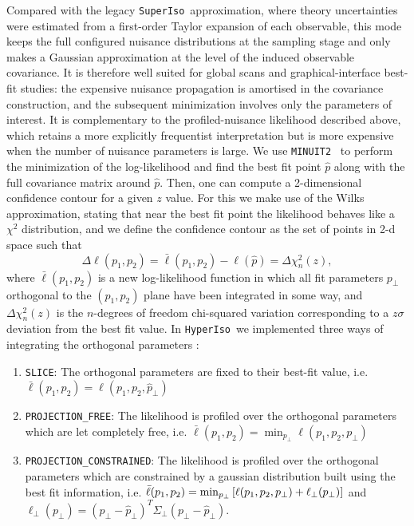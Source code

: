 \documentclass[preprint,11pt]{elsarticle}
\newcommand{\hi}{\texttt{HyperIso}}
\newcommand{\spi}{\texttt{SuperIso}}
\begin{document}
Compared with the legacy \spi~approximation, where theory uncertainties were estimated from a first-order Taylor expansion of each observable, this mode keeps the full configured nuisance distributions at the sampling stage and only makes a Gaussian approximation at the level of the induced observable covariance.  It is therefore well suited for global scans and graphical-interface best-fit studies: the expensive nuisance propagation is amortised in the covariance construction, and the subsequent minimization involves only the parameters of interest.  It is complementary to the profiled-nuisance likelihood described above, which retains a more explicitly frequentist interpretation but is more expensive when the number of nuisance parameters is large.\smallbreak
We use \texttt{MINUIT2}~\cite{James:1975dr} to perform the minimization of the log-likelihood and find the best fit point $\hat p$ along with the full covariance matrix around $\hat p$. Then, one can compute a 2-dimensional confidence contour for a given $z$ value. For this we make use of the Wilks approximation, stating that near the best fit point the likelihood behaves like a $\chi^2$ distribution, and we define the confidence contour as the set of points in 2-d space such that
\begin{equation}
    \Delta\ell(p_1,p_2)=\bar\ell(p_1,p_2)-\ell(\hat p)=\Delta\chi^2_n(z),
\end{equation}
where $\bar\ell(p_1,p_2)$ is a new log-likelihood function in which all fit parameters $p_\perp$ orthogonal to the $(p_1,p_2)$ plane have been integrated in some way, and $\Delta\chi_n^2(z)$ is the $n$-degrees of freedom chi-squared variation corresponding to a $z\sigma$ deviation from the best fit value. In \hi~we implemented three ways of integrating the orthogonal parameters :
\begin{enumerate}
    \item \texttt{SLICE}: The orthogonal parameters are fixed to their best-fit value, i.e. $\bar\ell(p_1,p_2)=\ell(p_1,p_2,\hat p_\perp)$
    \item \texttt{PROJECTION\_FREE}: The likelihood is profiled over the orthogonal parameters which are let completely free, i.e. $\bar\ell(p_1,p_2)=\min_{p_\perp}\ell(p_1,p_2,p_\perp)$
    \item \texttt{PROJECTION\_CONSTRAINED}: The likelihood is profiled over the orthogonal parameters which are constrained by a gaussian distribution built using the best fit information, i.e. $\bar\ell(p_1,p_2)=\min_{p_\perp}\qty[\ell(p_1,p_2,p_\perp)+\ell_\perp(p_\perp)]$ and $\ell_\perp(p_\perp)=(p_\perp-\hat p_\perp)^T\Sigma_\perp(p_\perp-\hat p_\perp)$.
\end{enumerate}
\end{document}
